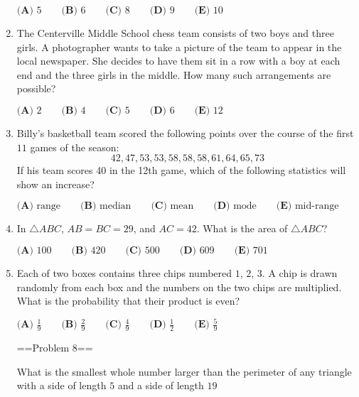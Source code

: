 \documentclass{article}
\begin{document}
\begin{enumerate}[label=\arabic*., itemsep=0.5em]
\(\textbf{(A) }5\qquad\textbf{(B) }6\qquad\textbf{(C) }8\qquad\textbf{(D) }9\qquad \textbf{(E) }10\)\par \vspace{0.5em}\item The Centerville Middle School chess team consists of two boys and three girls. A photographer wants to take a picture of the team to appear in the local newspaper. She decides to have them sit in a row with a boy at each end and the three girls in the middle. How many such arrangements are possible? 

\(\textbf{(A) }2\qquad\textbf{(B) }4\qquad\textbf{(C) }5\qquad\textbf{(D) }6\qquad \textbf{(E) }12\)\par \vspace{0.5em}\item Billy's basketball team scored the following points over the course of the first \(11\) games of the season: 
\begin{equation*}
42, 47, 53, 53, 58, 58, 58, 61, 64, 65, 73
\end{equation*}
 If his team scores 40 in the 12th game, which of the following statistics will show an increase?

\(\textbf{(A) } \text{range} \qquad \textbf{(B) } \text{median} \qquad \textbf{(C) } \text{mean} \qquad \textbf{(D) } \text{mode} \qquad \textbf{(E) } \text{mid-range}\)\par \vspace{0.5em}\item In \(\triangle ABC\), \(AB=BC=29\), and \(AC=42\). What is the area of \(\triangle ABC\)?

\(\textbf{(A) }100\qquad\textbf{(B) }420\qquad\textbf{(C) }500\qquad\textbf{(D) }609\qquad \textbf{(E) }701\)\par \vspace{0.5em}\item Each of two boxes contains three chips numbered \(1\), \(2\), \(3\). A chip is drawn randomly from each box and the numbers on the two chips are multiplied. What is the probability that their product is even?

\(\textbf{(A) }\frac{1}{9}\qquad\textbf{(B) }\frac{2}{9}\qquad\textbf{(C) }\frac{4}{9}\qquad\textbf{(D) }\frac{1}{2}\qquad \textbf{(E) }\frac{5}{9}\)



==Problem 8== 

What is the smallest whole number larger than the perimeter of any triangle with a side of length \(5\) and a side of length \(19\)


\end{enumerate}
\end{document}
